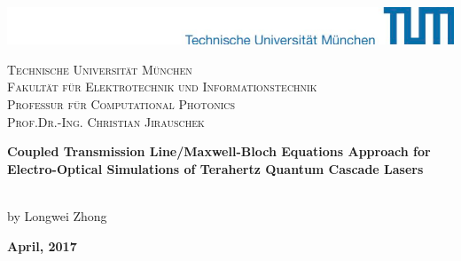 %

\begin{titlepage}
\begin{center}
    \includegraphics[width=\textwidth]{images/Logos2.pdf}%
    
    \vspace{25mm}	
    
    {
        \scshape	
        Technische Universität München\\
        Fakultät für Elektrotechnik und Informationstechnik\\																										%
        Professur für Computational Photonics\\
        Prof.Dr.-Ing. Christian Jirauschek
    }
		
    \vspace{25mm}																								

    \begin{LARGE}
        \normalfont\rmfamily \textbf{Coupled Transmission Line/Maxwell-Bloch Equations Approach for Electro-Optical Simulations of Terahertz Quantum Cascade Lasers}\\[6cm]
    \end{LARGE}
   \\[0.5cm]
    
    by Longwei Zhong

    \textbf{April, 2017}\\[2cm]
																	
 																	
\end{center}

\end{titlepage}

\clearpage \thispagestyle{empty} \cleardoublepage 
